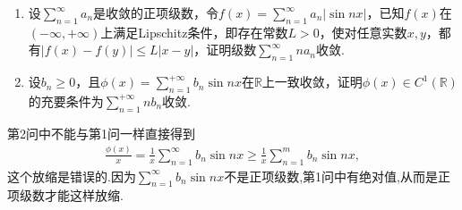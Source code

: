 \documentclass[../../main.tex]{subfiles}
\begin{document}
\begin{example}
\begin{enumerate}
\item 设$\sum\limits_{n = 1}^{\infty}a_{n}$是收敛的正项级数，令$f(x)=\sum\limits_{n = 1}^{\infty}a_{n}|\sin nx|$，已知$f(x)$在$(-\infty,+\infty)$上满足Lipschitz条件，即存在常数$L>0$，使对任意实数$x,y$，都有$|f(x) - f(y)|\leqslant L|x - y|$，证明级数$\sum\limits_{n = 1}^{\infty}na_{n}$收敛.

\item 设$b_{n}\geqslant0$，且$\phi(x)=\sum\limits_{n = 1}^{+\infty}b_{n}\sin nx$在$\mathbb{R}$上一致收敛，证明$\phi(x)\in C^{1}(\mathbb{R})$的充要条件为$\sum\limits_{n = 1}^{+\infty}nb_{n}$收敛.
\end{enumerate}
\end{example}
\begin{remark}
第2问中不能与第1问一样直接得到
\begin{align*}
\frac{\phi \left( x \right)}{x}=\frac{1}{x}\sum_{n=1}^{\infty}{b_n\sin nx}\geqslant \frac{1}{x}\sum_{n=1}^m{b_n\sin nx},
\end{align*}
这个放缩是错误的.因为$\sum_{n=1}^{\infty}{b_n\sin nx}$不是正项级数,第1问中有绝对值,从而是正项级数才能这样放缩.
\end{remark}
\end{document}
